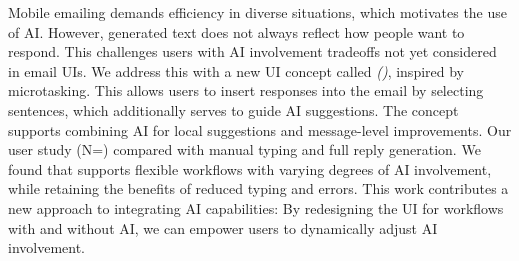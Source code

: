 Mobile emailing demands efficiency in diverse situations, which motivates the use of AI. However, generated text does not always reflect how people want to respond. This challenges users with AI involvement tradeoffs not yet considered in email UIs. We address this with a new UI concept called \textit{\modeoursTXT{} (\modeours)}, inspired by microtasking. This allows users to insert responses into the email by selecting sentences, which additionally serves to guide AI suggestions. The concept supports combining AI for local suggestions and message-level improvements. Our user study (N=\studyTwoN) compared \modeours{} with manual typing and full reply generation. We found that \modeours{} supports flexible workflows with varying degrees of AI involvement, while retaining the benefits of reduced typing and errors. This work contributes a new approach to integrating AI capabilities: By redesigning the UI for workflows with and without AI, we can empower users to dynamically adjust AI involvement. %

















